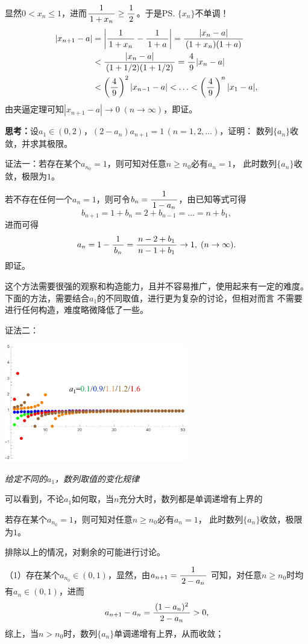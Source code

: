 显然$0<x_n\leq1$，进而$\displaystyle\frac{\,{1}\,}{\,{1+x_n}\,}\geq\displaystyle\frac{\,{1}\,}{\,{2}\,}$。于是\ps{$\{x_n\}$不单调！}
\begin{align}
	|x_{n+1}-a|&=\left|\displaystyle\frac{\,{1}\,}{\,{1+x_n}\,}-\displaystyle\frac{\,{1}\,}{\,{1+a}\,}\right|=\displaystyle\frac{\,{|x_n-a|}\,}{\,{(1+x_n)(1+a)}\,}\notag\\
	&<\displaystyle\frac{\,{|x_n-a|}\,}{\,{(1+1/2)(1+1/2)}\,}=\displaystyle\frac{\,{4}\,}{\,{9}\,}|x_n-a|\notag\\
	&<\left(\displaystyle\frac{\,{4}\,}{\,{9}\,}\right)^2|x_{n-1}-a|<\ldots<\left(\displaystyle\frac{\,{4}\,}{\,{9}\,}\right)^{n}|x_1-a|,\notag
\end{align}
由夹逼定理可知$|x_{n+1}-a|\to0\;(n\to\infty)$，即证。
\fi

\bs
{\bf 思考：}设$a_1\in(0,2)$，$(2-a_n)a_{n+1}=1\,(n=1,2,\ldots)$，证明：
数列$\{a_n\}$收敛，并求其极限。

\ifhint
证法一：若存在某个$a_{n_0}=1$，则可知对任意$n\geq n_0$必有$a_n=1$，
此时数列$\{a_n\}$收敛，极限为$1$。

若不存在任何一个$a_n=1$，则可令$b_n=\displaystyle\frac{\,{1}\,}{\,{1-a_n}\,}$，由已知等式可得
$$b_{n+1}=1+b_n=2+b_{n-1}=\ldots=n+b_1,$$
进而可得
$$a_n=1-\displaystyle\frac{\,{1}\,}{\,{b_n}\,}=\displaystyle\frac{\,{n-2+b_1}\,}{\,{n-1+b_1}\,}\to 1,\;(n\to\infty).$$
即证。\fin

这个方法需要很强的观察和构造能力，且并不容易推广，使用起来有一定的难度。
下面的方法，需要结合$a_1$的不同取值，进行更为复杂的讨论，但相对而言
不需要进行任何构造，难度略微降低了一些。

证法二：
\begin{center}
	\includegraphics[width=8cm]{./images/ch01/a2a.pdf}
	
	\it 给定不同的$a_1$，数列取值的变化规律
	
	可以看到，不论$a_1$如何取，当$n$充分大时，数列都是单调递增有上界的
\end{center}

若存在某个$a_{n_0}=1$，则可知对任意$n\geq n_0$必有$a_n=1$，
此时数列$\{a_n\}$收敛，极限为$1$。

排除以上的情况，对剩余的可能进行讨论。

（1）存在某个$a_{n_0}\in(0,1)$，显然，由$a_{n+1}=\displaystyle\frac{\,{1}\,}{\,{2-a_n}\,}$
可知，对任意$n\geq n_0$时均有$a_n\in(0,1)$，进而
$$a_{n+1}-a_n=\displaystyle\frac{\,{(1-a_n)^2}\,}{\,{2-a_n}\,}>0,$$
综上，当$n>n_0$时，数列$\{a_n\}$单调递增有上界，从而收敛；

